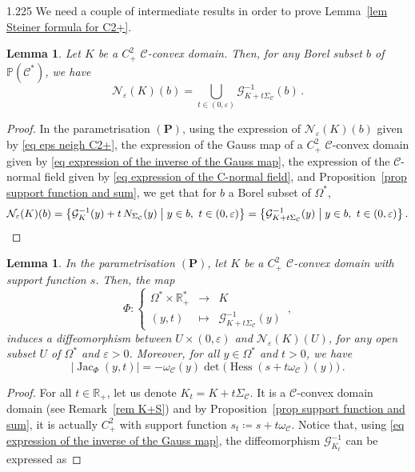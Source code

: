 \documentclass[reqno, a4paper]{amsart}
\numberwithin{equation}{section}
\numberwithin{figure}{section}
\newtheorem{lemma}[theorem]{Lemma}
\theoremstyle{definition}
\theoremstyle{remark}
\newcommand{\R}{\mathbb{R}} %
\renewcommand{\P}{\mathbb{P}} %
\DeclareMathOperator{\Hess}{Hess} %
\DeclareMathOperator{\Jac}{Jac} %
\newcommand{\C}{\mathcal{C}} %
\renewcommand{\S}{\Sigma_\C} %
\newcommand{\G}{\mathcal{G}} %
\newcommand{\st}{\; \middle\vert \;} %
\newcommand{\namelessfunction}[4]{ \left\lbrace \begin{matrix}
{#1} &\longrightarrow& {#2}\\
{#3} & \longmapsto & {#4}
\end{matrix} \right. }
\newcommand{\function}[5]{{#1}: \namelessfunction{#2}{#3}{#4}{#5}}
\newcommand{\bp}[1]{{\bigl( {#1} \bigr)}} %
\begin{document}
\begin{spacing}{1.225}
We need a couple of intermediate results in order to prove Lemma~\ref{lem Steiner formula for C2+}. 

\begin{lemma}
\label{Foliation of neighbourhood}
Let $K$ be a $C^2_+$ $\C$-convex domain. Then, for any Borel subset $b$ of $\P(\C^*)$, we have
\begin{equation*}
\mathcal{N}_\varepsilon(K)(b) = \bigcup_{t \in (0,\varepsilon)} \G_{K+t\S}^{-1}(b) \, . 
\end{equation*}
\end{lemma}
\begin{proof}
In the parametrisation $(\mathbf{P})$, using the expression of $\mathcal{N}_\varepsilon(K)(b)$ given by \eqref{eq eps neigh C2+}, the expression of the Gauss map of a $C^2_+$ $\C$-convex domain given by \eqref{eq expression of the inverse of the Gauss map}, the expression of the $\C$-normal field given by \eqref{eq expression of the C-normal field}, and Proposition~\ref{prop support function and sum}, we get that for $b$ a Borel subset of $\Omega^*$,
\begin{equation*}
\mathcal{N}_\varepsilon(K)(b) = \left\lbrace \G_{K}^{-1}(y)+t \, N_{\S}(y)\st y\in b , \ t \in (0,\varepsilon )\right\rbrace= \left\lbrace \G_{K+t\S}^{-1}(y)\st y\in b , \ t \in (0,\varepsilon) \right\rbrace . \qedhere
\end{equation*}
\end{proof}
\begin{lemma}
\label{lem Jacobian computation}
In the parametrisation $(\mathbf{P})$, let $K$ be a $C^2_+$ $\C$-convex domain with support function $s$. Then, the map
\begin{equation*}
\function{\Phi}{\Omega^* \times \R^*_+}{K}{(y,t)}{\G_{K+t\S}^{-1}(y)} \, ,
\end{equation*}
induces a diffeomorphism between $U\times (0,\varepsilon)$ and $\mathcal{N}_\varepsilon(K)(U)$, for any open subset $U$ of $\Omega^*$ and $\varepsilon > 0$. Moreover, for all $y\in \Omega^*$ and $t>0$, we have
\begin{equation*}
 \left\vert \Jac_\Phi(y,t) \right\vert = -\omega_\C(y) \det\bp{\Hess (s + t \omega_\C)(y)} \, . 
\end{equation*}
\end{lemma}
\begin{proof}
For all $t\in \R_+$, let us denote $K_t = K+t\S$. It is a $\C$-convex domain domain (see Remark~\ref{rem K+S}) and by Proposition~\ref{prop support function and sum}, it is actually $C^2_+$ with support function $s_t \coloneqq s + t \omega_\C$. Notice that, using \eqref{eq expression of the inverse of the Gauss map}, the diffeomorphism $\G_{K_t}^{-1}$ can be expressed as

\end{proof}
\end{spacing}
\end{document}
